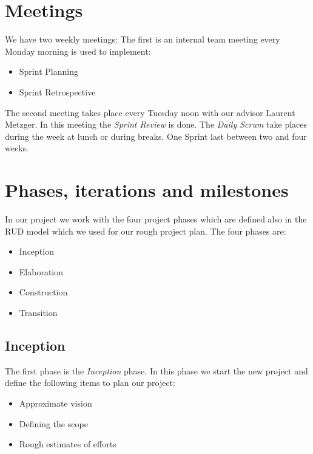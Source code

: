 \section{Meetings}
\label{meetings}
We have two weekly meetings: \newline
The first is an internal team meeting every Monday morning is used to implement:
\begin{itemize}
  \item Sprint Planning
  \item Sprint Retrospective 
\end{itemize}

\noindent The second meeting takes place every Tuesday noon with our advisor Laurent Metzger.
In this meeting the \textsl{Sprint Review} is done.
\newline
\noindent The \textsl{Daily Scrum} take places during the week at lunch or during breaks.
One Sprint last between two and four weeks.


\section{Phases, iterations and milestones}
\label{phases}
In our project we work with the four project phases which are defined also in the RUD model which we used for our rough project plan. The four phases are:
\begin{itemize}
    \item Inception
    \item Elaboration
    \item Construction
    \item Transition
\end{itemize}

\subsection{Inception}
The first phase is the \textit{Inception} phase. In this phase we start the new project and  define the following items to plan our project:
\begin{itemize}
    \item Approximate vision
    \item Defining the scope
    \item Rough estimates of efforts
\end{itemize}


